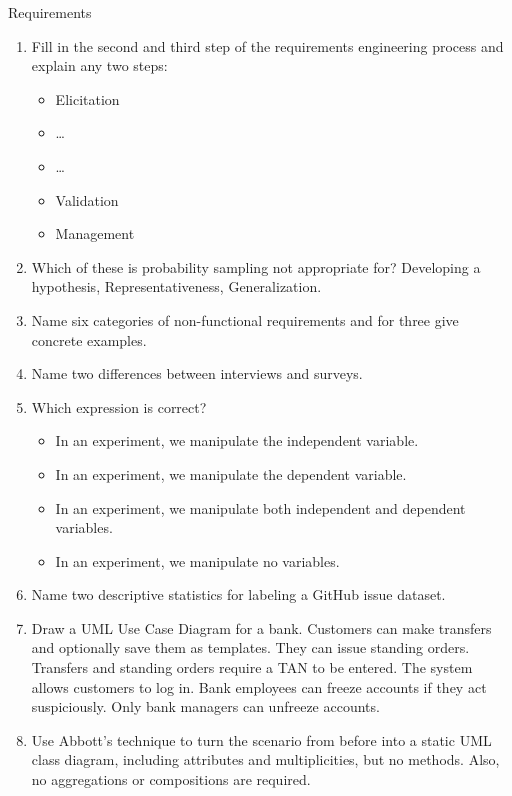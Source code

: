 \documentclass{article}
\begin{document}
\begin{exercise}{Requirements}
  \begin{enumerate}
    \item Fill in the second and third step of the requirements engineering process and explain any two steps:
      \begin{itemize}
        \item Elicitation
        \item …
        \item …
        \item Validation
        \item Management
      \end{itemize}
    \item Which of these is probability sampling not appropriate for? Developing a hypothesis, Representativeness, Generalization.
    \item Name six categories of non-functional requirements and for three give concrete examples.
    \item Name two differences between interviews and surveys.
    \item Which expression is correct?
      \begin{itemize}
        \item In an experiment, we manipulate the independent variable.
        \item In an experiment, we manipulate the dependent variable.
        \item In an experiment, we manipulate both independent and dependent variables.
        \item In an experiment, we manipulate no variables.
      \end{itemize}
    \item Name two descriptive statistics for labeling a GitHub issue dataset.
    \item Draw a UML Use Case Diagram for a bank. Customers can make transfers and optionally save them as templates. They can issue standing orders. Transfers and standing orders require a TAN to be entered. The system allows customers to log in. Bank employees can freeze accounts if they act suspiciously. Only bank managers can unfreeze accounts.
    \item Use Abbott's technique to turn the scenario from before into a static UML class diagram, including attributes and multiplicities, but no methods. Also, no aggregations or compositions are required.
    \end{enumerate}

  \begin{solution}
  \end{solution}
\end{exercise}
\end{document}

